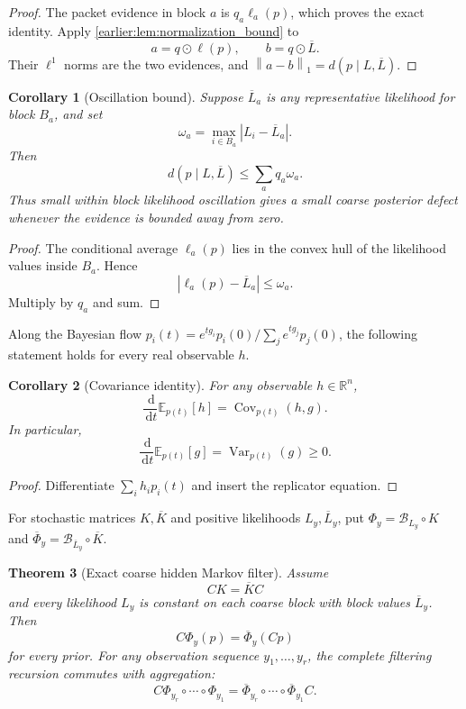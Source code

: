 \documentclass[11pt,a4paper]{article}
\newtheorem{theorem}{Theorem}[section]
\newtheorem{corollary}[theorem]{Corollary}
\theoremstyle{definition}
\theoremstyle{remark}
\newcommand{\Var}{\operatorname{Var}}
\newcommand{\Cov}{\operatorname{Cov}}
\newcommand{\norm}[1]{\left\lVert#1\right\rVert}
\newcommand{\RR}{\mathbb R}
\newcommand{\Bcal}{\mathcal B}
\newcommand{\dd}{\,\mathrm d}
\newcommand{\abs}[1]{\left\lvert#1\right\rvert}
\newcommand{\EE}{\mathbb E}
\begin{document}
\begin{proof}
The packet evidence in block \(a\) is \(q_a\ell_a(p)\), which proves the exact identity. Apply \cref{earlier:lem:normalization_bound} to
\[
a=q\odot\ell(p),
\qquad
b=q\odot\overline L.
\]
Their \(\ell^1\) norms are the two evidences, and \(\norm{a-b}_1=d(p\mid L,\overline L)\).
\end{proof}

\begin{corollary}[Oscillation bound]\label{earlier:record:014}\label{earlier:cor:bayes_oscillation}
Suppose \(\overline L_a\) is any representative likelihood for block \(B_a\), and set
\[
\omega_a
=
\max_{i\in B_a}\abs{L_i-\overline L_a}.
\]
Then
\[
d(p\mid L,\overline L)
\leq
\sum_aq_a\omega_a.
\]
Thus small within block likelihood oscillation gives a small coarse posterior defect whenever the evidence is bounded away from zero.
\end{corollary}

\begin{proof}
The conditional average \(\ell_a(p)\) lies in the convex hull of the likelihood values inside \(B_a\). Hence
\[
\abs{\ell_a(p)-\overline L_a}\leq\omega_a.
\]
Multiply by \(q_a\) and sum.
\end{proof}


Along the Bayesian flow $p_i(t)=e^{tg_i}p_i(0)/\sum_j e^{tg_j}p_j(0)$, the following statement holds for every real observable $h$.
\begin{corollary}[Covariance identity]\label{earlier:record:015}\label{earlier:cor:bayesian_covariance}
For any observable \(h\in\RR^n\),
\[
\frac{\dd}{\dd t}\EE_{p(t)}[h]
=
\Cov_{p(t)}(h,g).
\]
In particular,
\[
\frac{\dd}{\dd t}\EE_{p(t)}[g]
=
\Var_{p(t)}(g)\geq0.
\]
\end{corollary}

\begin{proof}
Differentiate \(\sum_ih_ip_i(t)\) and insert the replicator equation.
\end{proof}


For stochastic matrices $K,\overline K$ and positive likelihoods $L_y,\overline L_y$, put $\Phi_y=\Bcal_{L_y}\circ K$ and $\overline\Phi_y=\Bcal_{\overline L_y}\circ\overline K$.
\begin{theorem}[Exact coarse hidden Markov filter]\label{earlier:record:016}\label{earlier:thm:exact_coarse_filter}
Assume
\[
CK=\overline KC
\]
and every likelihood \(L_y\) is constant on each coarse block with block values \(\overline L_y\). Then
\[
C\Phi_y(p)=\overline\Phi_y(Cp)
\]
for every prior. For any observation sequence \(y_1,\ldots,y_r\), the complete filtering recursion commutes with aggregation:
\[
C\Phi_{y_r}\circ\cdots\circ\Phi_{y_1}
=
\overline\Phi_{y_r}\circ\cdots\circ\overline\Phi_{y_1}C.
\]
\end{theorem}
\end{document}
